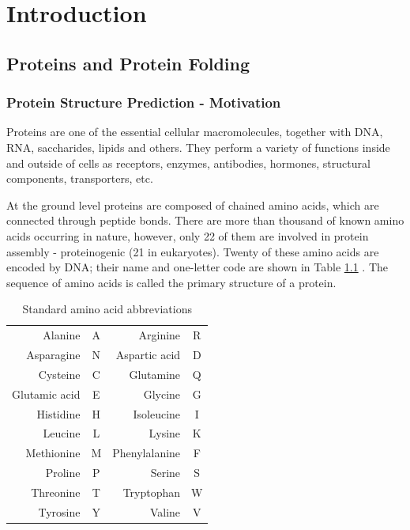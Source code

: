 \chapter{Introduction}

\section{Proteins and Protein Folding}

\subsection{Protein Structure Prediction - Motivation}
    
Proteins are one of the essential cellular macromolecules, together with DNA, RNA, saccharides, lipids and others.
They perform a variety of functions inside and outside of cells as receptors, enzymes, antibodies, hormones, structural components, transporters, etc. 

At the ground level proteins are composed of chained amino acids, which are connected through peptide bonds. 
There are more than thousand of known amino acids occurring in nature, however, only 22 of them are involved in protein assembly - proteinogenic (21 in eukaryotes). 
Twenty of these amino acids are encoded by DNA; their name and one-letter code are shown in Table \ref{tab:aa_codes} \cite{protgenaa}. 
The sequence of amino acids is called the primary structure of a protein.

\begin{table}
    \centering
    \begin{tabular}{r|c|r|c|}
        Alanine & A & Arginine & R \\
        Asparagine & N & Aspartic acid & D \\
        Cysteine & C & Glutamine & Q \\
        Glutamic acid & E & Glycine & G \\
        Histidine & H & Isoleucine & I \\
        Leucine & L & Lysine & K \\
        Methionine & M & Phenylalanine & F \\
        Proline & P & Serine & S \\
        Threonine & T & Tryptophan & W \\
        Tyrosine & Y & Valine & V
    \end{tabular}
    \caption{Standard amino acid abbreviations}
    \label{tab:aa_codes}
\end{table}

